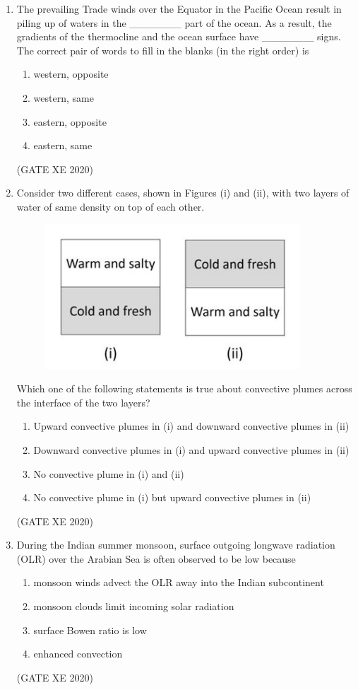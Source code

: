 \documentclass[12pt]{article}
\begin{document}
\begin{enumerate}
\item The prevailing Trade winds over the Equator in the Pacific Ocean result in piling up of waters in the \_\_\_\_\_\_\_ part of the ocean. As a result, the gradients of the thermocline and the ocean surface have \_\_\_\_\_\_\_ signs. The correct pair of words to fill in the blanks (in the right order) is
\begin{enumerate}
\item western, opposite
\item western, same
\item eastern, opposite
\item eastern, same
\end{enumerate}
(GATE XE 2020)

\item Consider two different cases, shown in Figures (i) and (ii), with two layers of water of same density on top of each other.  

\begin{figure}[H]
    \centering
    \includegraphics[width=0.5\columnwidth]{figs/ass4_h_q14.png}
    \caption{}
    \label{fig:placeholder}
\end{figure}

Which one of the following statements is true about convective plumes across the interface of the two layers?  
\begin{enumerate}
\item Upward convective plumes in (i) and downward convective plumes in (ii)  
\item Downward convective plumes in (i) and upward convective plumes in (ii)  
\item No convective plume in (i) and (ii)  
\item No convective plume in (i) but upward convective plumes in (ii)  
\end{enumerate}
(GATE XE 2020)

\item During the Indian summer monsoon, surface outgoing longwave radiation (OLR) over the Arabian Sea is often observed to be low because
\begin{enumerate}
\item monsoon winds advect the OLR away into the Indian subcontinent  
\item monsoon clouds limit incoming solar radiation  
\item surface Bowen ratio is low  
\item enhanced convection  
\end{enumerate}
(GATE XE 2020)


\end{enumerate}
\end{document}
